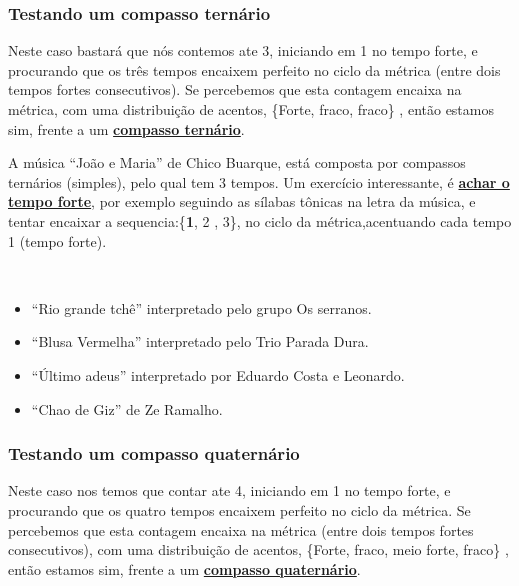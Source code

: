 \subsubsection{Testando um compasso ternário}
Neste caso bastará que nós contemos ate 3, iniciando em 1 no tempo forte,
e procurando que os três tempos encaixem perfeito no ciclo da métrica (entre dois tempos fortes consecutivos).
Se percebemos que esta contagem encaixa na métrica,
com uma distribuição de acentos, \{Forte, fraco, fraco\} \cite[pp. 10]{wright1992social}, 
então estamos sim, frente a um  \hyperref[subsec:compassoternario]{\textbf{compasso ternário}}.

\begin{example}
\label{ex:compassosimples3t3}
A música ``João e Maria'' de Chico Buarque,
está composta por compassos ternários (simples), pelo qual tem 3 tempos.
Um exercício interessante, é \hyperref[subsec:perceberTF1]{\textbf{achar o tempo forte}},
por exemplo seguindo as sílabas tônicas na letra da música,
e tentar encaixar a sequencia:\{\textbf{1}, 2 , 3\}, no ciclo da métrica,acentuando cada tempo 1 (tempo forte). 
\end{example}

\begin{example}
\label{ex:compassosimples3t2}
~
\begin{itemize}
\item ``Rio grande tchê'' interpretado pelo grupo Os serranos.
\item ``Blusa Vermelha'' interpretado pelo Trio Parada Dura.
\item ``Último adeus'' interpretado por Eduardo Costa e Leonardo.
\item ``Chao de Giz'' de Ze Ramalho.
\end{itemize}
\end{example}

\subsubsection{Testando um compasso quaternário}
Neste caso nos temos que contar ate 4, iniciando em 1 no tempo forte,
e procurando que os quatro tempos encaixem perfeito no ciclo da métrica.
Se percebemos que esta contagem encaixa na métrica (entre dois tempos fortes consecutivos),
com uma distribuição de acentos, \{Forte, fraco, meio forte, fraco\} \cite[pp. 10]{wright1992social}, 
então estamos sim, frente a um  \hyperref[subsec:compassoquaternario]{\textbf{compasso quaternário}}.


